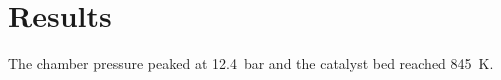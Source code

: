 \section{Results}
The chamber pressure peaked at \SI{12.4}{\bar} and the catalyst bed reached \SI{845}{\kelvin}.
